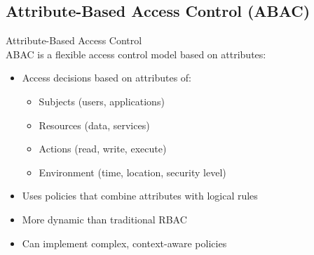 \subsection{Attribute-Based Access Control (ABAC)}

\begin{definition}{Attribute-Based Access Control}\\
ABAC is a flexible access control model based on attributes:
\begin{itemize}
    \item Access decisions based on attributes of:
    \begin{itemize}
        \item Subjects (users, applications)
        \item Resources (data, services)
        \item Actions (read, write, execute)
        \item Environment (time, location, security level)
    \end{itemize}
    \item Uses policies that combine attributes with logical rules
    \item More dynamic than traditional RBAC
    \item Can implement complex, context-aware policies
\end{itemize}
\end{definition}

